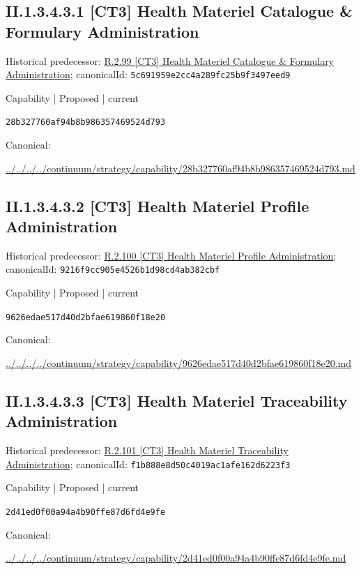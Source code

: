 \documentclass[10pt,a4paper]{article}
\begin{document}
\subsection*{II.1.3.4.3.1 [CT3] Health Materiel Catalogue \& Formulary Administration}
Historical predecessor: \hyperref[element-5c691959e2cc4a289fc25b9f3497eed9]{R.2.99 [CT3] Health Materiel Catalogue \& Formulary Administration}; canonicalId: \texttt{5c691959e2cc4a289fc25b9f3497eed9}\par
\label{element-28b327760af94b8b986357469524d793}
{\small Capability | Proposed | current}\par
\texttt{28b327760af94b8b986357469524d793}\par
Canonical: \par
{\footnotesize\url{../../../../continuum/strategy/capability/28b327760af94b8b986357469524d793.md}}\par
\subsection*{II.1.3.4.3.2 [CT3] Health Materiel Profile Administration}
Historical predecessor: \hyperref[element-9216f9cc905e4526b1d98cd4ab382cbf]{R.2.100 [CT3] Health Materiel Profile Administration}; canonicalId: \texttt{9216f9cc905e4526b1d98cd4ab382cbf}\par
\label{element-9626edae517d40d2bfae619860f18e20}
{\small Capability | Proposed | current}\par
\texttt{9626edae517d40d2bfae619860f18e20}\par
Canonical: \par
{\footnotesize\url{../../../../continuum/strategy/capability/9626edae517d40d2bfae619860f18e20.md}}\par
\subsection*{II.1.3.4.3.3 [CT3] Health Materiel Traceability Administration}
Historical predecessor: \hyperref[element-f1b888e8d50c4019ac1afe162d6223f3]{R.2.101 [CT3] Health Materiel Traceability Administration}; canonicalId: \texttt{f1b888e8d50c4019ac1afe162d6223f3}\par
\label{element-2d41ed0f00a94a4b90ffe87d6fd4e9fe}
{\small Capability | Proposed | current}\par
\texttt{2d41ed0f00a94a4b90ffe87d6fd4e9fe}\par
Canonical: \par
{\footnotesize\url{../../../../continuum/strategy/capability/2d41ed0f00a94a4b90ffe87d6fd4e9fe.md}}\par
\end{document}
